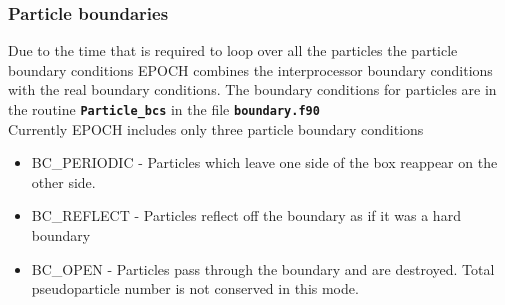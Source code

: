 \documentclass[12pt]{article}
\newcommand{\inlinecode}[1]{{\color{warwickred} \bf\texttt{#1}}}
\newcommand{\nEPOCH}{{\color{warwickdark}\fontfamily{phv}\selectfont EPOCH}}
\newcommand{\EPOCH}{{\nEPOCH} }
\begin{document}
\subsubsection{Particle boundaries}
Due to the time that is required to loop over all the particles the particle
boundary conditions \EPOCH combines the interprocessor boundary conditions with
the real boundary conditions. The boundary conditions for particles are in the
routine \inlinecode{Particle\_bcs} in the file \inlinecode{boundary.f90} \\
Currently \EPOCH includes only three particle boundary conditions
\begin{itemize}
\item BC\_PERIODIC - Particles which leave one side of the box reappear on the
  other side.
\item BC\_REFLECT - Particles reflect off the boundary as if it was a hard
  boundary
\item BC\_OPEN - Particles pass through the boundary and are destroyed. Total
  pseudoparticle number is not conserved in this mode.
\end{itemize}
\end{document}

